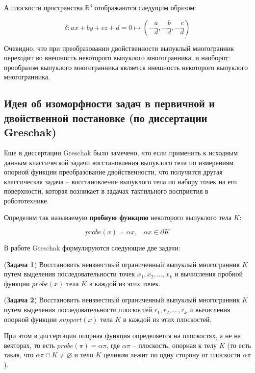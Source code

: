 \documentclass[a4paper, 12pt, titlepage]{article}
\theoremstyle{definition}
\theoremstyle{plain}
\theoremstyle{plain}
\begin{document}
А плоскости пространства $\mathbb{R}^{3}$ отображаются следущим образом:

\begin{equation}
 \delta : a x + b y + c z + d = 0 \longmapsto
 \left(- \frac{a}{d}, - \frac{b}{d}, - \frac{c}{d}\right)
\end{equation}

Очевидно, что при преобразовании двойственности выпуклый многогранник переходит
во внешность некоторого выпуклого многогранника, и наоборот: прообразом
выпуклого многогранника является внешность некоторого выпуклого многогранника.

\subsection{Идея об изоморфности задач в первичной и двойственной постановке
(по диссертации Greschak)}

Еще в диссертации Greschak \cite{thesis/Greschak1985} было замечено, что если
применить к исходным данным классической задачи восстановления выпуклого тела по
измерениям опорной функции преобразование двойственности, что получится другая
классическая задача -- восстановление выпуклого тела по набору точек на его
поверхности, которая возникает в задачах тактильного восприятия в робототехнике.

Определим так называемую \textbf{пробную функцию} некоторого выпуклого тела $K$:

\begin{equation}
 probe(x) = \alpha x, \;\;\; \alpha x \in \partial K
\end{equation}

В работе Greschak формулируются следующие две задачи:

\begin{flushleft}
 (\textbf{Задача 1}) Восстановить неизвестный ограниченный выпуклый
 многогранник $K$ путем выделения последовательности точек
 $x_{1}, x_{2}, \ldots, x_{k}$ и вычисления пробной функции $probe(x)$ тела $K$
 в каждой из этих точек.
\end{flushleft}

\begin{flushleft}
 (\textbf{Задача 2}) Восстановить неизвестный ограниченный выпуклый
 многогранник $K$ путем выделения последовательности плоскостей
 $r_{1}, r_{2}, \ldots, r_{k}$ и вычисления опорной функции $support(x)$ тела
 $K$ в каждой из этих плоскостей.
\end{flushleft}

При этом в диссертации опорная функция определяется на плоскостях, а не на
векторах, то есть $probe(\pi) = \alpha \pi$, где $\alpha \pi$ -- плоскость,
опорная к телу $K$ (то есть такая, что $\alpha \pi \cap K \neq \varnothing$ и
тело $K$ целиком лежит по одну сторону от плоскости $\alpha \pi$).
\end{document}
